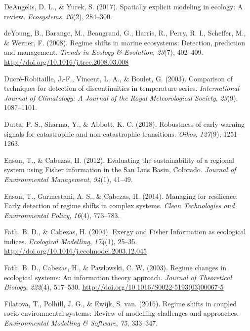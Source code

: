 \documentclass[12pt,twoside,openany]{reedthesis}
\begin{document}
\hypertarget{ref-deangelis2017spatially}{}
DeAngelis, D. L., \& Yurek, S. (2017). Spatially explicit modeling in
ecology: A review. \emph{Ecosystems}, \emph{20}(2), 284--300.

\hypertarget{ref-deyoung_regime_2008}{}
deYoung, B., Barange, M., Beaugrand, G., Harris, R., Perry, R. I.,
Scheffer, M., \& Werner, F. (2008). Regime shifts in marine ecosystems:
Detection, prediction and management. \emph{Trends in Ecology \&
Evolution}, \emph{23}(7), 402--409.
\url{http://doi.org/10.1016/j.tree.2008.03.008}

\hypertarget{ref-ducre2003comparison}{}
Ducré-Robitaille, J.-F., Vincent, L. A., \& Boulet, G. (2003).
Comparison of techniques for detection of discontinuities in temperature
series. \emph{International Journal of Climatology: A Journal of the
Royal Meteorological Society}, \emph{23}(9), 1087--1101.

\hypertarget{ref-dutta2018robustness}{}
Dutta, P. S., Sharma, Y., \& Abbott, K. C. (2018). Robustness of early
warning signals for catastrophic and non-catastrophic transitions.
\emph{Oikos}, \emph{127}(9), 1251--1263.

\hypertarget{ref-eason_evaluating_2012}{}
Eason, T., \& Cabezas, H. (2012). Evaluating the sustainability of a
regional system using Fisher information in the San Luis Basin,
Colorado. \emph{Journal of Environmental Management}, \emph{94}(1),
41--49.

\hypertarget{ref-eason2014managing}{}
Eason, T., Garmestani, A. S., \& Cabezas, H. (2014). Managing for
resilience: Early detection of regime shifts in complex systems.
\emph{Clean Technologies and Environmental Policy}, \emph{16}(4),
773--783.

\hypertarget{ref-fath_exergy_2004}{}
Fath, B. D., \& Cabezas, H. (2004). Exergy and Fisher Information as
ecological indices. \emph{Ecological Modelling}, \emph{174}(1), 25--35.
\url{http://doi.org/10.1016/j.ecolmodel.2003.12.045}

\hypertarget{ref-fath_regime_2003}{}
Fath, B. D., Cabezas, H., \& Pawlowski, C. W. (2003). Regime changes in
ecological systems: An information theory approach. \emph{Journal of
Theoretical Biology}, \emph{222}(4), 517--530.
\url{http://doi.org/10.1016/S0022-5193(03)00067-5}

\hypertarget{ref-filatova2016regime}{}
Filatova, T., Polhill, J. G., \& Ewijk, S. van. (2016). Regime shifts in
coupled socio-environmental systems: Review of modelling challenges and
approaches. \emph{Environmental Modelling \& Software}, \emph{75},
333--347.
\end{document}
